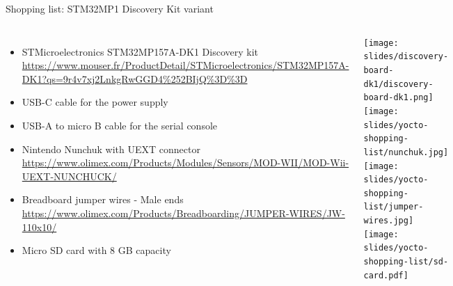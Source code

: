 \begin{frame}[fragile]{Shopping list: STM32MP1 Discovery Kit variant}
  \begin{columns}
    \begin{itemize}
    \item STMicroelectronics STM32MP157A-DK1 Discovery kit
      {\fontsize{6}{6}\selectfont
        \url{https://www.mouser.fr/ProductDetail/STMicroelectronics/STM32MP157A-DK1?qs=9r4v7xj2LnkgRwGGD4%252BIjQ%3D%3D}
      }
    \item USB-C cable for the power supply
    \item USB-A to micro B cable for the serial console
    \item Nintendo Nunchuk with UEXT connector
      {\fontsize{6}{6}\selectfont
        \url{https://www.olimex.com/Products/Modules/Sensors/MOD-WII/MOD-Wii-UEXT-NUNCHUCK/}
      }
    \item Breadboard jumper wires - Male ends
      {\fontsize{6}{6}\selectfont
        \url{https://www.olimex.com/Products/Breadboarding/JUMPER-WIRES/JW-110x10/}
      }
    \item Micro SD card with 8 GB capacity
    \end{itemize}
    \begin{center}
      \texttt{[image: slides/discovery-board-dk1/discovery-board-dk1.png]}\\
      \texttt{[image: slides/yocto-shopping-list/nunchuk.jpg]} \\
      \texttt{[image: slides/yocto-shopping-list/jumper-wires.jpg]} \\
      \texttt{[image: slides/yocto-shopping-list/sd-card.pdf]}
    \end{center}
  \end{columns}
\end{frame}
